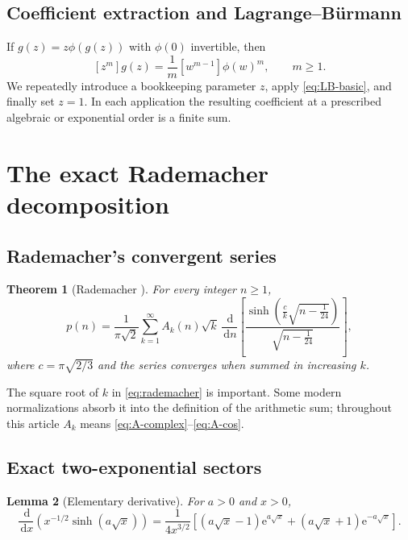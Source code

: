 \documentclass[11pt,a4paper]{article}
\numberwithin{equation}{section}
\newtheorem{theorem}{Theorem}[section]
\newtheorem{lemma}[theorem]{Lemma}
\theoremstyle{definition}
\theoremstyle{remark}
\newcommand{\e}{\mathrm e}
\newcommand{\dd}{\,\mathrm d}
\begin{document}
\subsection{Coefficient extraction and Lagrange--B\"urmann}

If $g(z)=z\phi(g(z))$ with $\phi(0)$ invertible, then
\begin{equation}\label{eq:LB-basic}
 [z^m]g(z)=\frac1m[w^{m-1}]\phi(w)^m,
 \qquad m\geq1.
\end{equation}
We repeatedly introduce a bookkeeping parameter $z$, apply
\eqref{eq:LB-basic}, and finally set $z=1$.  In each application the resulting
coefficient at a prescribed algebraic or exponential order is a finite sum.

\section{The exact Rademacher decomposition}

\subsection{Rademacher's convergent series}

\begin{theorem}[Rademacher \cite{Rademacher1937PNAS,Rademacher1938,EberlPaulson2026}]\label{thm:rademacher}
For every integer $n\geq1$,
\begin{equation}\label{eq:rademacher}
 p(n)=\frac1{\pi\sqrt2}\sum_{k=1}^{\infty}
 A_k(n)\sqrt{k}\,\frac{\dd}{\dd n}
 \left[
 \frac{\sinh\!\left(\frac{c}{k}\sqrt{n-\frac1{24}}\right)}
      {\sqrt{n-\frac1{24}}}
 \right],
\end{equation}
where $c=\pi\sqrt{2/3}$ and the series converges when summed in increasing
$k$.
\end{theorem}

The square root of $k$ in \eqref{eq:rademacher} is important.  Some modern
normalizations absorb it into the definition of the arithmetic sum; throughout
this article $A_k$ means \eqref{eq:A-complex}--\eqref{eq:A-cos}.

\subsection{Exact two-exponential sectors}

\begin{lemma}[Elementary derivative]\label{lem:elementary-derivative}
For $a>0$ and $x>0$,
\begin{equation}\label{eq:elementary-derivative}
 \frac{\dd}{\dd x}\left(x^{-1/2}\sinh(a\sqrt x)\right)
 =\frac1{4x^{3/2}}
 \left[(a\sqrt x-1)\e^{a\sqrt x}
      +(a\sqrt x+1)\e^{-a\sqrt x}\right].
\end{equation}
\end{lemma}
\end{document}
